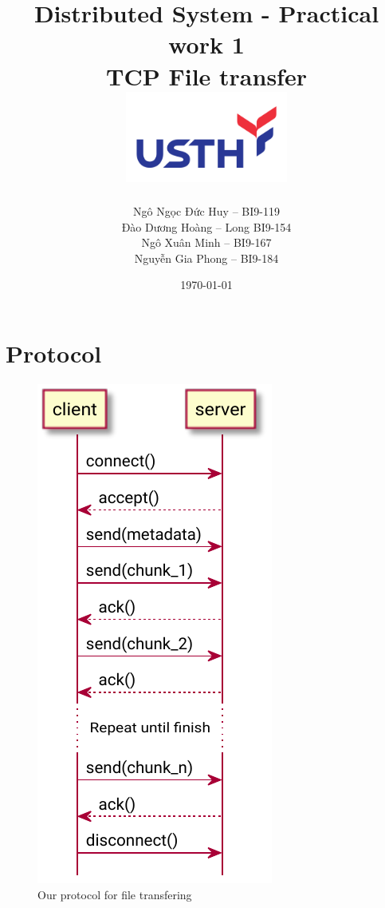 \documentclass{article}
\begin{document}
\begin{titlepage}
	\title{
		\Large{Distributed System - Practical work 1} \\
		\Huge{\textbf{TCP File transfer}} \\
		\includegraphics[width=0.4\textwidth]{logo-usth-pa3-01.png}
	}
	\author{
		 Ngô Ngọc Đức Huy -- BI9-119 \\
		 Đào Dương Hoàng -- Long BI9-154 \\
		 Ngô Xuân Minh -- BI9-167 \\
		 Nguyễn Gia Phong -- BI9-184
	}
	\date{\today}
\end{titlepage}

\maketitle

\section{Protocol}

\begin{figure}
	\centering
	\includegraphics{pw1/protocol.pdf}
	\caption{Our protocol for file transfering}
\end{figure}
\end{document}
